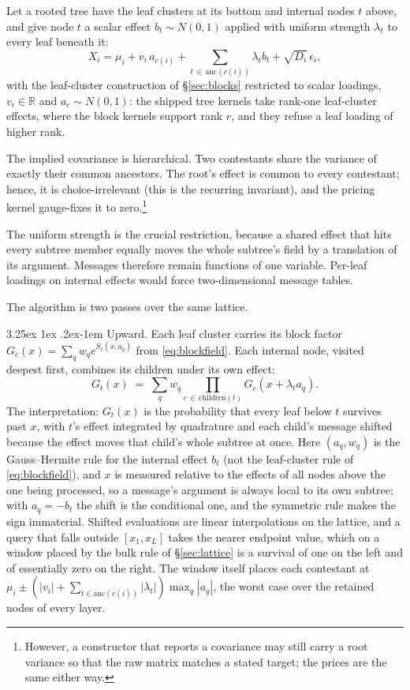 \documentclass[11pt]{article}
\makeatletter
\renewcommand\paragraph{\@startsection{paragraph}{4}{\z@}%
  {3.25ex \@plus1ex \@minus.2ex}{-1em}%
  {\normalfont\normalsize\itshape}}
\newcommand{\R}{\mathbb{R}}
\makeatother
\begin{document}
Let a rooted tree have the leaf clusters at its bottom and internal nodes $t$
above, and give node $t$ a scalar effect $b_t\sim N(0,1)$ applied with uniform
strength $\lambda_t$ to every leaf beneath it:
\begin{equation}
X_i=\mu_i+v_i\,a_{c(i)}+\sum_{t\,\in\,\mathrm{anc}(c(i))}\lambda_t b_t
    +\sqrt{D_i}\,\epsilon_i ,
\end{equation}
with the leaf-cluster construction of \S\ref{sec:blocks} restricted to
scalar loadings, $v_i\in\R$ and $a_c\sim N(0,1)$: the shipped tree
kernels take rank-one leaf-cluster effects, where the block kernels
support rank $r$, and they refuse a leaf loading of higher rank.

The implied covariance is hierarchical. Two contestants share the variance of
exactly their common ancestors. The root's effect is common to every contestant; hence, it
is choice-irrelevant (this is the recurring invariant), and the pricing kernel gauge-fixes it to zero.\footnote{However, a constructor that reports a covariance may still carry a root variance so
that the raw matrix matches a stated target; the prices are the same
either way.}

The uniform strength is the crucial restriction,
because a shared effect that hits every subtree member equally moves the whole
subtree's field by a translation of its argument. Messages therefore remain
functions of one variable. Per-leaf loadings on internal effects would force
two-dimensional message tables.

The algorithm is two passes over the same lattice.

\paragraph{Upward.} Each leaf cluster carries its block factor
$G_c(x)=\sum_q w_q e^{S_c(x,a_q)}$ from \eqref{eq:blockfield}. Each internal
node, visited deepest first, combines its children under its own effect:
\begin{equation}\label{eq:up}
G_t(x)\;=\;\sum_q w_q \prod_{c\,\in\,\mathrm{children}(t)} G_c\!\left(x+\lambda_t
a_q\right).
\end{equation}
The interpretation: $G_t(x)$ is the probability that every leaf below $t$ survives past
$x$, with $t$'s effect integrated by quadrature and each child's message shifted
because the effect moves that child's whole subtree at once. Here
$(a_q,w_q)$ is the Gauss--Hermite rule for the internal effect $b_t$ (not
the leaf-cluster rule of \eqref{eq:blockfield}), and $x$ is measured
relative to the effects of all nodes above the one being processed, so a
message's argument is always local to its own subtree; with $a_q=-b_t$ the
shift is the conditional one, and the symmetric rule makes the sign
immaterial. Shifted evaluations are linear interpolations on the lattice,
and a query that falls outside $[x_1,x_L]$ takes the nearer endpoint value,
which on a window placed by the bulk rule of \S\ref{sec:lattice} is a
survival of one on the left and of essentially zero on the right. The
window itself places each contestant at $\mu_i\pm(|v_i|+\sum_{t\in
\mathrm{anc}(c(i))}|\lambda_t|)\max_q|a_q|$, the worst case over the
retained nodes of every layer.
\end{document}
